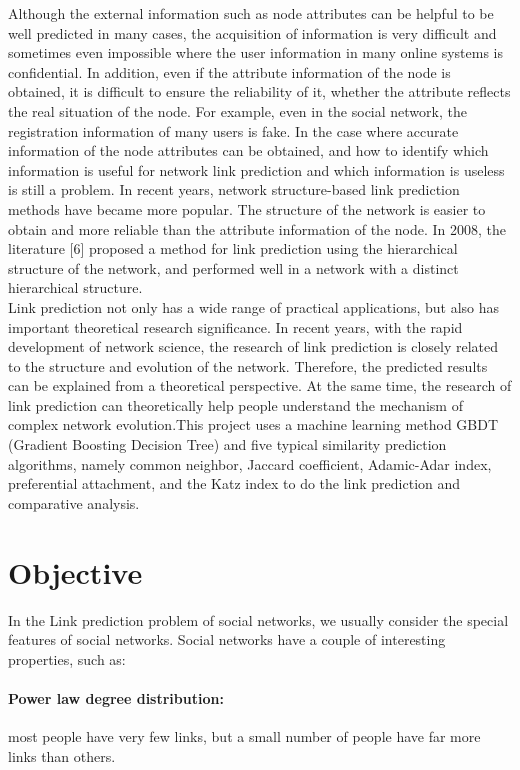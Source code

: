 \documentclass{article}
\begin{document}
Although the external information such as node attributes can be helpful to be well predicted in many cases, the acquisition of information is very difficult and sometimes even impossible where the user information in many online systems is confidential. In addition, even if the attribute information of the node is obtained, it is difficult to ensure the reliability of it, whether the attribute reflects the real situation of the node. For example, even in the social network, the registration information of many users is fake. In the case where accurate information of the node attributes can be obtained, and how to identify which information is useful for network link prediction and which information is useless is still a problem. In recent years, network structure-based link prediction methods have became more popular. The structure of the network is easier to obtain and more reliable than the attribute information of the node. In 2008, the literature [6] proposed a method for link prediction using the hierarchical structure of the network, and performed well in a network with a distinct hierarchical structure. \\

Link prediction not only has a wide range of practical applications, but also has important theoretical research significance. In recent years, with the rapid development of network science, the research of link prediction is closely related to the structure and evolution of the network. Therefore, the predicted results can be explained from a theoretical perspective. At the same time, the research of link prediction can theoretically help people understand the mechanism of complex network evolution.This project uses a machine learning method GBDT (Gradient Boosting Decision Tree) and five typical similarity prediction algorithms, namely common neighbor, Jaccard coefficient,  Adamic-Adar index, preferential attachment, and the Katz index to do the link prediction and comparative analysis.
	

\section{Objective}
In the Link prediction problem of social networks, we usually consider the special features of social networks. Social networks have a couple of interesting properties, such as:\\
\paragraph{Power law degree distribution:}most people have very few links, but a small number of people have far more links than others.\\
\end{document}
